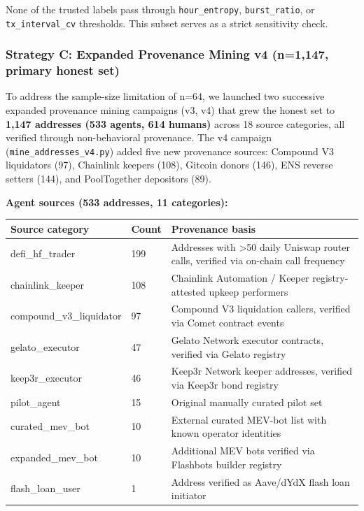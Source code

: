 \documentclass[sigconf,nonacm=false]{acmart}
\begin{document}
None of the trusted labels pass through \texttt{hour\_entropy}, \texttt{burst\_ratio}, or \texttt{tx\_interval\_cv} thresholds. This subset serves as a strict sensitivity check.

\subsubsection{Strategy C: Expanded Provenance Mining v4 (n=1,147, \textbf{primary honest set})}

To address the sample-size limitation of n=64, we launched two successive expanded provenance mining campaigns (v3, v4) that grew the honest set to \textbf{1,147 addresses (533 agents, 614 humans)} across 18 source categories, all verified through non-behavioral provenance. The v4 campaign (\texttt{mine\_addresses\_v4.py}) added five new provenance sources: Compound V3 liquidators (97), Chainlink keepers (108), Gitcoin donors (146), ENS reverse setters (144), and PoolTogether depositors (89).

\textbf{Agent sources (533 addresses, 11 categories):}

\begin{table}[h]
\centering
\small
\begin{tabular}{lll}
\toprule
Source category & Count & Provenance basis \\
\midrule
defi\_hf\_trader & 199 & Addresses with >50 daily Uniswap router calls, verified via on-chain call frequency \\
chainlink\_keeper & 108 & Chainlink Automation / Keeper registry-attested upkeep performers \\
compound\_v3\_liquidator & 97 & Compound V3 liquidation callers, verified via Comet contract events \\
gelato\_executor & 47 & Gelato Network executor contracts, verified via Gelato registry \\
keep3r\_executor & 46 & Keep3r Network keeper addresses, verified via Keep3r bond registry \\
pilot\_agent & 15 & Original manually curated pilot set \\
curated\_mev\_bot & 10 & External curated MEV-bot list with known operator identities \\
expanded\_mev\_bot & 10 & Additional MEV bots verified via Flashbots builder registry \\
flash\_loan\_user & 1 & Address verified as Aave/dYdX flash loan initiator \\
\bottomrule
\end{tabular}
\end{table}
\end{document}
